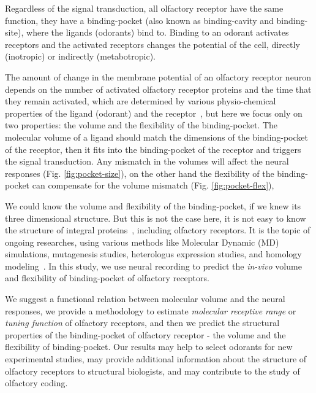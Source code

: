 \documentclass[11pt]{article} %
\begin{document}
Regardless of the signal transduction, 
all olfactory receptor have the same function, they have a binding-pocket (also known as binding-cavity and binding-site),
where the ligands (odorants) bind to. 
Binding to an odorant activates receptors and 
the activated receptors changes the potential of the cell, 
directly (inotropic) or indirectly (metabotropic).

The amount of change in the membrane potential of an olfactory receptor neuron depends on the number of activated olfactory receptor proteins and the time that they remain activated,
which are determined by various physio-chemical properties of the ligand (odorant) and the receptor~\cite{Turin,Araneda2000,Gabler2013,guerrieri2005,uchida2000}, 
but here we focus only on two properties: the volume and the flexibility of the binding-pocket.
The molecular volume of a ligand should match the dimensions of the binding-pocket of the receptor,
then it fits into the binding-pocket of the receptor and triggers the signal transduction. 
Any mismatch in the volumes will affect the neural responses (Fig. \ref{fig:pocket-size}), 
on the other hand the flexibility of the binding-pocket can compensate for the volume mismatch (Fig. \ref{fig:pocket-flex}),

We could know the volume and flexibility of the binding-pocket, 
if we knew its three dimensional structure.
But this is not the case here, 
it is not easy to know the structure of integral proteins~\cite{Zhang2008,Lupieri2009}, 
including olfactory receptors. 
It is the topic of ongoing researches, 
using various methods like Molecular Dynamic (MD) simulations, 
mutagenesis studies, heterologus expression studies, and homology modeling~\cite{Khafizov2007,Man2004,Lai2005,Vaidehi2002,Floriano2004,Schmiedeberg2007,Katada2005,Kato2008,Rospars2013}.
In this study, we use neural recording to predict the {\it in-vivo} volume and flexibility of binding-pocket of olfactory receptors.

We suggest a functional relation between molecular volume and the neural responses, 
we provide a methodology to estimate {\it molecular receptive range} or {\it tuning function} of olfactory receptors,
and then we predict the structural properties of the binding-pocket of olfactory receptor - the volume and the flexibility of binding-pocket.
Our results may help to select odorants  for new experimental studies, 
may provide additional information about the structure of olfactory receptors to structural biologists, 
and may contribute to the study of olfactory coding.
\end{document}
